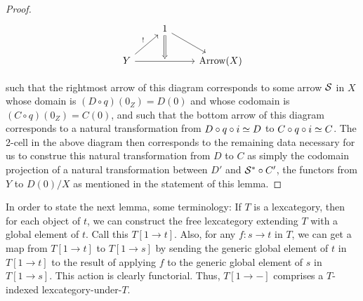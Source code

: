 \begin{proof}
\[\begin{tikzcd}
	& 1 \\
	Y && {\arrowcat{X}}
	\arrow["\unique", from=2-1, to=1-2]
	\arrow[from=1-2, to=2-3]
	\arrow[""{name=0, anchor=center}, from=2-1, to=2-3]
	\arrow[Rightarrow, from=1-2, to=0]
\end{tikzcd}\]

such that the rightmost arrow of this diagram corresponds to some arrow $\mathcal{S}$ in $X$ whose domain is $(D \circ q)(0_Z) = D(0)$ and whose codomain is $(C \circ q)(0_Z) = C(0)$, and such that the bottom arrow of this diagram corresponds to a natural transformation from $D \circ q \circ i \simeq D$ to $C \circ q \circ i \simeq C$. The 2-cell in the above diagram then corresponds to the remaining data necessary for us to construe this natural transformation from $D$ to $C$ as simply the codomain projection of a natural transformation between $D'$ and $\mathcal{S}^{*} \circ C'$, the functors from $Y$ to $D(0)/X$ as mentioned in the statement of this lemma.
\end{proof}


In order to state the next lemma, some terminology: If $T$ is a lexcategory, then for each object of $t$, we can construct the free lexcategory extending $T$ with a global element of $t$. Call this $T[1 \to t]$. Also, for any $f : s \to t$ in $T$, we can get a map from $T[1 \to t]$ to $T[1 \to s]$ by sending the generic global element of $t$ in $T[1 \to t]$ to the result of applying $f$ to the generic global element of $s$ in $T[1 \to s]$. This action is clearly functorial. Thus, $T[1 \to -]$ comprises a $T$-indexed lexcategory-under-$T$. 

